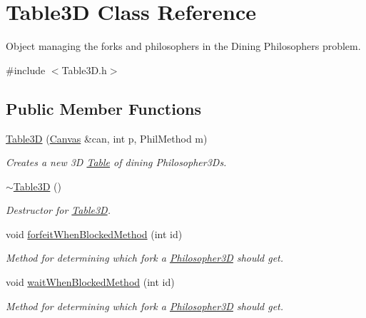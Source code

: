 \hypertarget{class_table3_d}{}\section{Table3D Class Reference}
\label{class_table3_d}


Object managing the forks and philosophers in the Dining Philosophers\textquotesingle{} problem.  




{\ttfamily \#include $<$Table3\+D.\+h$>$}

\subsection*{Public Member Functions}
\begin{DoxyCompactItemize}
\item 
\hyperlink{class_table3_d_a25cc4fef80875c5b09bfc438a2f96549}{Table3D} (\hyperlink{classtsgl_1_1_canvas}{Canvas} \&can, int p, Phil\+Method m)
\begin{DoxyCompactList}\small\item\em Creates a new 3D \hyperlink{class_table}{Table} of dining Philosopher3\+Ds. \end{DoxyCompactList}\item 
\mbox{\label{class_table3_d_a6f9be8aa87f9354069aa40e7b634d462}} 
\hyperlink{class_table3_d_a6f9be8aa87f9354069aa40e7b634d462}{$\sim$\+Table3D} ()
\begin{DoxyCompactList}\small\item\em Destructor for \hyperlink{class_table3_d}{Table3D}. \end{DoxyCompactList}\item 
void \hyperlink{class_table3_d_abcbe27c7295a6ca53d8a6e479c3a258d}{forfeit\+When\+Blocked\+Method} (int id)
\begin{DoxyCompactList}\small\item\em Method for determining which fork a \hyperlink{class_philosopher3_d}{Philosopher3D} should get. \end{DoxyCompactList}\item 
void \hyperlink{class_table3_d_aea2b67e82829dc28c5ba3b098ef7f57f}{wait\+When\+Blocked\+Method} (int id)
\begin{DoxyCompactList}\small\item\em Method for determining which fork a \hyperlink{class_philosopher3_d}{Philosopher3D} should get. \end{DoxyCompactList}\item 

\end{DoxyCompactItemize}
